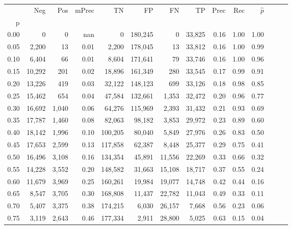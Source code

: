 \begin{tabular}{rrrrrrrrrrrrrr}
\toprule
{} &     Neg &    Pos & mPrec &       TN &       FP &      FN &      TP &  Prec &   Rec & $\hat{p}$ \\
p    &         &        &       &          &          &         &         &       &       &           \\
\midrule
0.00 &       0 &      0 &   nan &        0 &  180,245 &       0 &  33,825 &  0.16 &  1.00 &      1.00 \\
0.05 &   2,200 &     13 &  0.01 &    2,200 &  178,045 &      13 &  33,812 &  0.16 &  1.00 &      0.99 \\
0.10 &   6,404 &     66 &  0.01 &    8,604 &  171,641 &      79 &  33,746 &  0.16 &  1.00 &      0.96 \\
0.15 &  10,292 &    201 &  0.02 &   18,896 &  161,349 &     280 &  33,545 &  0.17 &  0.99 &      0.91 \\
0.20 &  13,226 &    419 &  0.03 &   32,122 &  148,123 &     699 &  33,126 &  0.18 &  0.98 &      0.85 \\
0.25 &  15,462 &    654 &  0.04 &   47,584 &  132,661 &   1,353 &  32,472 &  0.20 &  0.96 &      0.77 \\
0.30 &  16,692 &  1,040 &  0.06 &   64,276 &  115,969 &   2,393 &  31,432 &  0.21 &  0.93 &      0.69 \\
0.35 &  17,787 &  1,460 &  0.08 &   82,063 &   98,182 &   3,853 &  29,972 &  0.23 &  0.89 &      0.60 \\
0.40 &  18,142 &  1,996 &  0.10 &  100,205 &   80,040 &   5,849 &  27,976 &  0.26 &  0.83 &      0.50 \\
0.45 &  17,653 &  2,599 &  0.13 &  117,858 &   62,387 &   8,448 &  25,377 &  0.29 &  0.75 &      0.41 \\
0.50 &  16,496 &  3,108 &  0.16 &  134,354 &   45,891 &  11,556 &  22,269 &  0.33 &  0.66 &      0.32 \\
0.55 &  14,228 &  3,552 &  0.20 &  148,582 &   31,663 &  15,108 &  18,717 &  0.37 &  0.55 &      0.24 \\
0.60 &  11,679 &  3,969 &  0.25 &  160,261 &   19,984 &  19,077 &  14,748 &  0.42 &  0.44 &      0.16 \\
0.65 &   8,547 &  3,705 &  0.30 &  168,808 &   11,437 &  22,782 &  11,043 &  0.49 &  0.33 &      0.11 \\
0.70 &   5,407 &  3,375 &  0.38 &  174,215 &    6,030 &  26,157 &   7,668 &  0.56 &  0.23 &      0.06 \\
0.75 &   3,119 &  2,643 &  0.46 &  177,334 &    2,911 &  28,800 &   5,025 &  0.63 &  0.15 &      0.04 \\

\end{tabular}
